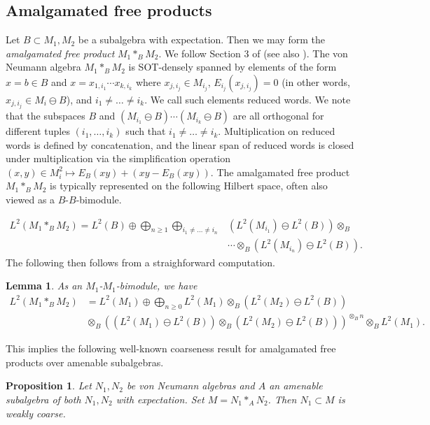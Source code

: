 \documentclass[10pt]{amsart}
\numberwithin{equation}{section}
\newtheorem{lem}[thm]{Lemma}
\newtheorem{prop}[thm]{Proposition}
\theoremstyle{definition}
\begin{document}
\subsection{Amalgamated free products}

Let $B\subset M_1,M_2$ be a subalgebra with expectation. Then we may form the \emph{amalgamated free product} $M_1*_BM_2$. We follow Section 3 of \cite{Popa93} (see also \cite[Section~2]{GKEPTconjugacy2025}). The von Neumann algebra $M_1 *_B M_2$ is SOT-densely spanned by elements of the form $x=b\in B$ and $x = x_{1,i_1}\cdots x_{k,i_k}$ where $x_{j,i_j}\in M_{i_j}$, $E_{i_j}(x_{j,i_j}) = 0$ (in other words, $x_{j,i_j}\in M_i\ominus B$), and $i_1\neq \ldots \neq i_k$. We call such elements reduced words. We note that the subspaces $B$ and $(M_{i_1}\ominus B)\cdots(M_{i_k}\ominus B)$ are all orthogonal for different tuples $(i_1,\ldots,i_k)$ such that $i_1\neq \ldots \neq i_k$. Multiplication on reduced words is defined by concatenation, and the linear span of reduced words is closed under multiplication via the simplification operation $(x,y)\in M_i^2 \mapsto E_B(xy) + (xy- E_B(xy))$. The amalgamated free product $M_1*_BM_2$ is typically represented on the following Hilbert space, often also viewed as a $B$-$B$-bimodule.

\begin{align*}
    L^2(M_1*_BM_2) = L^2(B) \oplus \bigoplus_{n\ge1}\bigoplus_{i_1\neq \ldots\neq i_n} &(L^2(M_{i_1})\ominus L^2(B))\otimes_B \\
    &\cdots \otimes_B (L^2(M_{i_n})\ominus L^2(B)).
\end{align*}
The following then follows from a straighforward computation.

\begin{lem}\label{lem: afp-bimod}
    As an $M_1$-$M_1$-bimodule, we have 
    \begin{align*}
        L^2(M_1*_BM_2) &= L^2(M_1) \oplus \bigoplus_{n\ge0} L^2(M_1) \otimes_B (L^2(M_2)\ominus L^2(B)) \\ &\otimes_B ((L^2(M_1)\ominus L^2(B)) \otimes_B (L^2(M_2)\ominus L^2(B)))^{\otimes_Bn} \otimes_B L^2(M_1).
    \end{align*}
\end{lem}

This implies the following well-known coarseness result for amalgamated free products over amenable subalgebras.

\begin{prop}\label{prop: amen-afp-wk-coarse}
    Let $N_1,N_2$ be von Neumann algebras and $A$ an amenable subalgebra of both $N_1,N_2$ with expectation. Set $M=N_1*_A N_2$. Then $N_1\subset M$ is weakly coarse.
\end{prop}
\end{document}
